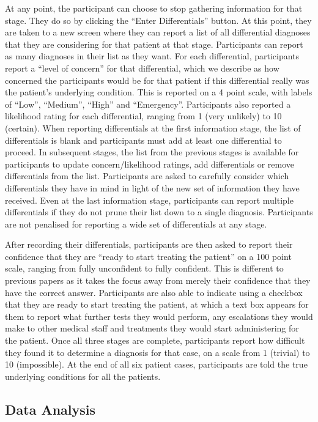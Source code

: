 \documentclass[a4paper, nobind]{templates/ociamthesis}
\begin{document}
At any point, the participant can choose to stop gathering information for that stage. They do so by clicking the ``Enter Differentials'' button. At this point, they are taken to a new screen where they can report a list of all differential diagnoses that they are considering for that patient at that stage. Participants can report as many diagnoses in their list as they want. For each differential, participants report a ``level of concern'' for that differential, which we describe as how concerned the participants would be for that patient if this differential really was the patient's underlying condition. This is reported on a 4 point scale, with labels of ``Low'', ``Medium'', ``High'' and ``Emergency''. Participants also reported a likelihood rating for each differential, ranging from 1 (very unlikely) to 10 (certain). When reporting differentials at the first information stage, the list of differentials is blank and participants must add at least one differential to proceed. In subsequent stages, the list from the previous stages is available for participants to update concern/likelihood ratings, add differentials or remove differentials from the list. Participants are asked to carefully consider which differentials they have in mind in light of the new set of information they have received. Even at the last information stage, participants can report multiple differentials if they do not prune their list down to a single diagnosis. Participants are not penalised for reporting a wide set of differentials at any stage.

After recording their differentials, participants are then asked to report their confidence that they are ``ready to start treating the patient'' on a 100 point scale, ranging from fully unconfident to fully confident. This is different to previous papers as it takes the focus away from merely their confidence that they have the correct answer. Participants are also able to indicate using a checkbox that they are ready to start treating the patient, at which a text box appears for them to report what further tests they would perform, any escalations they would make to other medical staff and treatments they would start administering for the patient. Once all three stages are complete, participants report how difficult they found it to determine a diagnosis for that case, on a scale from 1 (trivial) to 10 (impossible). At the end of all six patient cases, participants are told the true underlying conditions for all the patients.

\hypertarget{data-analysis}{%
\subsection*{Data Analysis}\label{data-analysis}}
\end{document}
